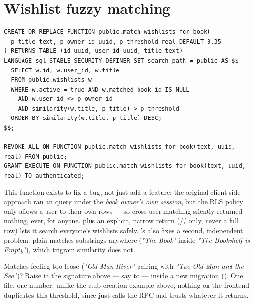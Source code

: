 \section{Wishlist fuzzy matching}

\begin{lstlisting}[style=olkcodesql, caption={match\_wishlists\_for\_book — pg\_trgm similarity search across all users}]
CREATE OR REPLACE FUNCTION public.match_wishlists_for_book(
  p_title text, p_owner_id uuid, p_threshold real DEFAULT 0.35
) RETURNS TABLE (id uuid, user_id uuid, title text)
LANGUAGE sql STABLE SECURITY DEFINER SET search_path = public AS $$
  SELECT w.id, w.user_id, w.title
  FROM public.wishlists w
  WHERE w.active = true AND w.matched_book_id IS NULL
    AND w.user_id <> p_owner_id
    AND similarity(w.title, p_title) > p_threshold
  ORDER BY similarity(w.title, p_title) DESC;
$$;

REVOKE ALL ON FUNCTION public.match_wishlists_for_book(text, uuid, real) FROM public;
GRANT EXECUTE ON FUNCTION public.match_wishlists_for_book(text, uuid, real) TO authenticated;
\end{lstlisting}

This function exists to fix a bug, not just add a feature: the original client-side approach ran an  query under the \emph{book owner's own session}, but the  RLS policy only allows a user to  their own rows — so cross-user matching silently returned nothing, ever, for anyone.  plus an explicit, narrow return (// only, never a full row) lets it search everyone's wishlists safely. 's  also fixes a second, independent problem: plain  matches substrings anywhere (\emph{"The Book"} inside \emph{"The Bookshelf is Empty"}), which trigram similarity does not.

\begin{olkhowto}
Matches feeling too loose (\emph{"Old Man River"} pairing with \emph{"The Old Man and the Sea"})? Raise  in the  signature above — say to  — inside a new migration (). One file, one number: unlike the club-creation example above, nothing on the frontend duplicates this threshold, since  just calls the RPC and trusts whatever it returns.
\end{olkhowto}

